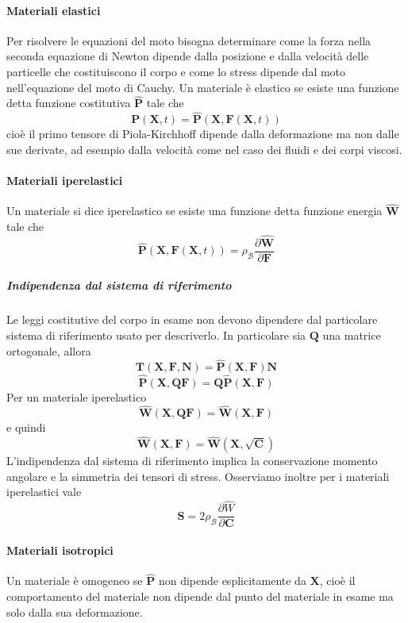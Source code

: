\paragraph{Materiali elastici}
Per risolvere le equazioni del moto bisogna determinare come la forza nella seconda equazione di Newton dipende dalla posizione e dalla velocità delle particelle che costituiscono il corpo e come lo stress dipende dal moto nell'equazione del moto di Cauchy. 
Un materiale è elastico se esiste una funzione detta funzione costitutiva $\widehat{\mathbf{P}}$ tale che
\begin{equation*}
\mathbf{P}(\mathbf{X},t)=\widehat{\mathbf{P}}(\mathbf{X},\mathbf{F}(\mathbf{X},t))
\end{equation*}
cioè il primo tensore di Piola-Kirchhoff dipende dalla deformazione ma non dalle sue derivate, ad esempio dalla velocità come nel caso dei fluidi e dei corpi viscosi.
\paragraph{Materiali iperelastici}
Un materiale si dice iperelastico se esiste una funzione detta funzione energia $\widehat{\mathbf{W}}$ tale che 
\begin{equation*}
\widehat{\mathbf{P}}(\mathbf{X},\mathbf{F}(\mathbf{X},t))=\rho_{\mathcal{B}}\frac{\partial \widehat{\mathbf{W}}}{\partial \mathbf{F}}
\end{equation*}
\subparagraph{\emph{Indipendenza dal sistema di riferimento}}
Le leggi costitutive del corpo in esame non devono dipendere dal particolare sistema di riferimento usato per descriverlo.
In particolare sia $\mathbf{Q}$ una matrice ortogonale, allora 
$$\mathbf{T}(\mathbf{X},\mathbf{F},\mathbf{N}) = \widehat{\mathbf{P}}(\mathbf{X},\mathbf{F})\mathbf{N} $$
$$\widehat{\mathbf{P}}(\mathbf{X},\mathbf{Q}\mathbf{F}) = \mathbf{Q}\widehat{\mathbf{P}}(\mathbf{X},\mathbf{F}) $$
Per un materiale iperelastico 
$$\widehat{\mathbf{W}}(\mathbf{X},\mathbf{Q}\mathbf{F}) = \widehat{\mathbf{W}}(\mathbf{X},\mathbf{F}) $$
e quindi
$$\widehat{\mathbf{W}}(\mathbf{X},\mathbf{F}) = \widehat{\mathbf{W}}(\mathbf{X},\sqrt{\mathbf{C}}) $$
L'indipendenza dal sistema di riferimento implica la conservazione momento angolare e la simmetria dei tensori di stress.
Osserviamo inoltre per i materiali iperelastici vale
\begin{equation*}
\widehat{\mathbf{S}} = 2\rho_{\mathcal{B}}\frac{\partial\widehat{W}}{\partial\mathbf{C}}
\end{equation*}
\paragraph{Materiali isotropici}
Un materiale è omogeneo se $\widehat{\mathbf{P}}$ non dipende esplicitamente da $\mathbf{X}$, cioè il comportamento del materiale non dipende dal punto del materiale in esame ma solo dalla sua deformazione.

